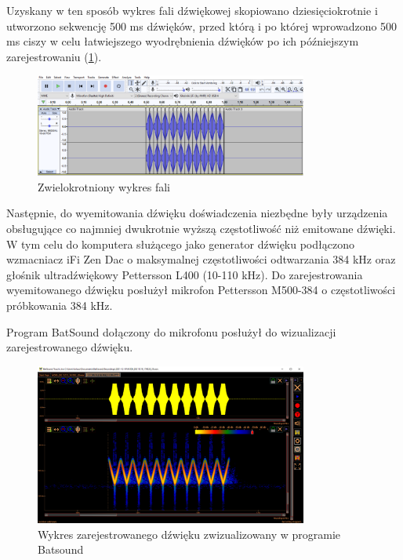 \documentclass{sprz}
\begin{document}
Uzyskany w ten sposób wykres fali dźwiękowej skopiowano dziesięciokrotnie i utworzono sekwencję 500 ms dźwięków, przed którą i po której wprowadzono 500 ms ciszy w celu łatwiejszego wyodrębnienia dźwięków po ich późniejszym zarejestrowaniu (\ref{img:wykres_fali_wielokrotnej}).

\begin{figure}[h]
    \centering
    \includegraphics[width=0.8\textwidth]{sprz/wykres_fali_wielokrotnej}
    \caption{Zwielokrotniony wykres fali}
    \label{img:wykres_fali_wielokrotnej}
\end{figure}

Następnie, do wyemitowania dźwięku doświadczenia niezbędne były urządzenia obsługujące co najmniej dwukrotnie wyższą częstotliwość niż emitowane dźwięki. W tym celu do komputera służącego jako generator dźwięku podłączono wzmacniacz iFi Zen Dac o maksymalnej częstotliwości odtwarzania 384 kHz oraz głośnik ultradźwiękowy Pettersson L400 (10-110 kHz). Do zarejestrowania wyemitowanego dźwięku posłużył mikrofon Pettersson M500-384 o częstotliwości próbkowania 384 kHz.

Program BatSound dołączony do mikrofonu posłużył do wizualizacji zarejestrowanego dźwięku.

\begin{figure}[h]
    \centering
    \includegraphics[width=0.8\textwidth]{sprz/batsound}
    \caption{Wykres zarejestrowanego dźwięku zwizualizowany w programie Batsound}
    \label{img:batsound}
\end{figure}
\end{document}
